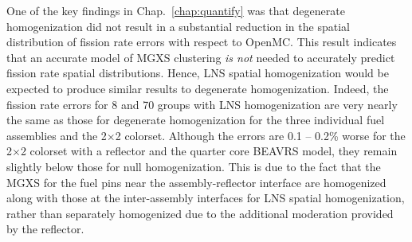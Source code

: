 One of the key findings in Chap.~\ref{chap:quantify} was that degenerate homogenization did not result in a substantial reduction in the spatial distribution of fission rate errors with respect to OpenMC. This result indicates that an accurate model of \ac{MGXS} clustering \textit{is not} needed to accurately predict fission rate spatial distributions. Hence, \ac{LNS} spatial homogenization would be expected to produce similar results to degenerate homogenization. Indeed, the fission rate errors for 8 and 70 groups with \ac{LNS} homogenization are very nearly the same as those for degenerate homogenization for the three individual fuel assemblies and the 2$\times$2 colorset. Although the errors are 0.1 -- 0.2\% worse for the 2$\times$2 colorset with a reflector and the quarter core \ac{BEAVRS} model, they remain slightly below those for null homogenization. This is due to the fact that the \ac{MGXS} for the fuel pins near the assembly-reflector interface are homogenized along with those at the inter-assembly interfaces for \ac{LNS} spatial homogenization, rather than separately homogenized due to the additional moderation provided by the reflector.

